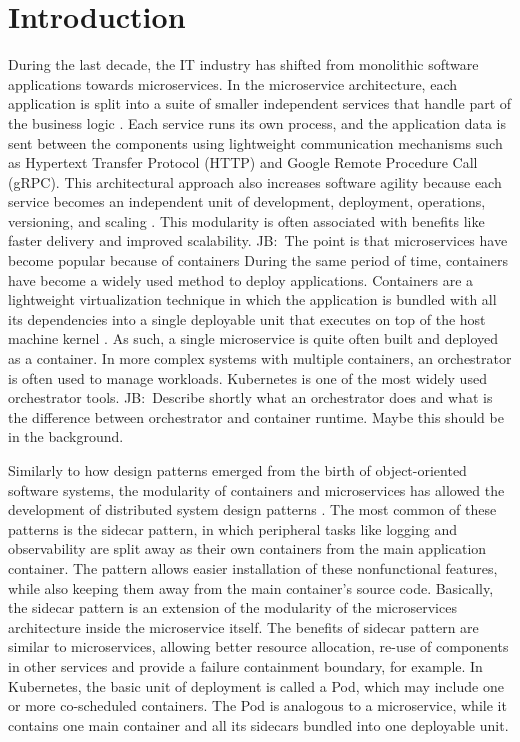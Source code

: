 \documentclass[english, 12pt, a4paper, sci, utf8, a-2b, online]{aaltothesis}
\newcommand{\mycomment}[3]{\textcolor{#1}{#2:~#3}}
\newcommand{\jb}[1]{\noindent\mycomment{aaltoRed}{JB}{#1}}
\begin{document}
\cleardoublepage

\thispagestyle{empty}

\section{Introduction} \label{sec:intro}

During the last decade, the IT industry has shifted from monolithic software applications towards microservices. In the microservice architecture, each application is split into a suite of smaller independent services that handle part of the business logic \cite{fowler2014microservices}. Each service runs its own process, and the application data is sent between the components using lightweight communication mechanisms such as Hypertext Transfer Protocol (HTTP) and Google Remote Procedure Call (gRPC).
This architectural approach also increases software agility because each service becomes an independent unit of development, deployment, operations, versioning, and scaling \cite{jamshidi2018microservices}. This modularity is often associated with benefits like faster delivery and improved scalability.
\jb{The point is that microservices have become popular because of containers}
During the same period of time, containers have become a widely used method to deploy applications. Containers are a lightweight virtualization technique in which the application is bundled with all its dependencies into a single deployable unit that executes on top of the host machine kernel \cite{bui2015analysis}. As such, a single microservice is quite often built and deployed as a container. In more complex systems with multiple containers, an orchestrator is often used to manage workloads. Kubernetes is one of the most widely used orchestrator tools.
\jb{Describe shortly what an orchestrator does and what is the difference between orchestrator and container runtime. Maybe this should be in the background.}

Similarly to how design patterns emerged from the birth of object-oriented software systems, the modularity of containers and microservices has allowed the development of distributed system design patterns \cite{burns2016design}.
The most common of these patterns is the sidecar pattern, in which peripheral tasks like logging and observability are split away as their own containers from the main application container.
The pattern allows easier installation of these nonfunctional features, while also keeping them away from the main container's source code.
Basically, the sidecar pattern is an extension of the modularity of the microservices architecture inside the microservice itself.
The benefits of sidecar pattern are similar to microservices, allowing better resource allocation, re-use of components in other services and provide a failure containment boundary, for example.
In Kubernetes, the basic unit of deployment is called a Pod, which may include one or more co-scheduled containers.
The Pod is analogous to a microservice, while it contains one main container and all its sidecars bundled into one deployable unit.
\end{document}

